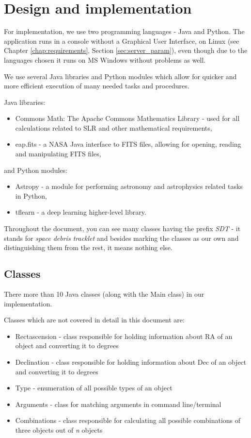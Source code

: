 \chapter{Design and implementation}\label{chap:design}

	For implementation, we use two programming languages - Java and Python. The application runs in a console without a Graphical User Interface, on Linux (see Chapter \ref{chap:requirements}, Section \ref{sec:server_param}), even though due to the languages chosen it runs on MS Windows without problems as well.
	
	We use several Java libraries and Python modules which allow for quicker and more efficient execution of many needed tasks and procedures.
	
	Java libraries:
\begin{itemize}
	\item Commons Math: The Apache Commons Mathematics Library - used for all calculations related to SLR and other mathematical requirements,
	\item eap.fits - a NASA Java interface to FITS files, allowing for opening, reading and manipulating FITS files,
\end{itemize}		

and Python modules:
\begin{itemize}
	\item Astropy - a module for performing astronomy and astrophysics related tasks in Python,
	\item tflearn - a deep learning higher-level library.
\end{itemize}

	Throughout the document, you can see many classes having the prefix \emph{SDT} - it stands for \emph{space debris tracklet} and besides marking the classes as our own and distinguishing them from the rest, it means nothing else.

\section{Classes}\label{sec:classes}

	There more than 10 Java classes (along with the Main class) in our implementation.
	
	Classes which are not covered in detail in this document are:
	
\begin{itemize}
	\item Rectascension - class responsible for holding information about RA of an object and converting it to degrees
	\item Declination - class responsible for holding information about Dec of an object and converting it to degrees
	\item Type - enumeration of all possible types of an object
	\item Arguments - class for matching arguments in command line/terminal
	\item Combinations - class responsible for calculating all possible combinations of three objects out of \emph{n} objects
\end{itemize}

